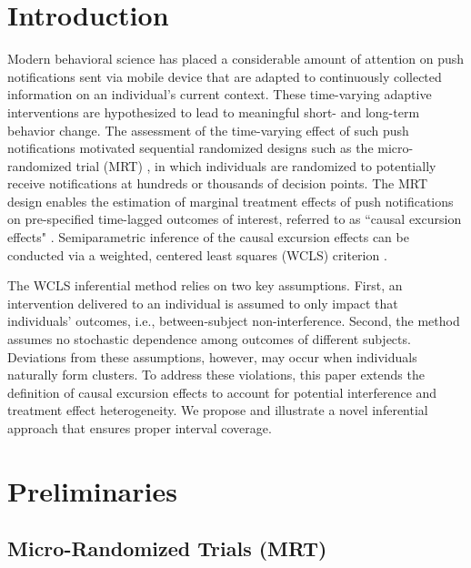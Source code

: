 \documentclass[lineno]{biometrika}
\begin{document}
\section{Introduction}

Modern behavioral science has placed a considerable amount of attention on push notifications sent via mobile device that are adapted to continuously collected information on an individual's current context.  These time-varying adaptive interventions are hypothesized to lead to meaningful short- and long-term behavior change. The assessment of the time-varying effect of such push notifications motivated sequential randomized designs such as the micro-randomized trial (MRT) \citep{Nahum2017, KlasnjaMRT}, in which individuals are randomized to potentially receive notifications at hundreds or thousands of decision points. The MRT design enables the estimation of marginal treatment effects of push notifications on pre-specified time-lagged outcomes of interest, referred to as ``causal excursion effects" \citep{Boruvkaetal, Qian2021, DempseyAOAS}. Semiparametric inference of the causal excursion effects can be conducted via a weighted, centered least squares (WCLS) criterion \citep{Boruvkaetal}. 

The WCLS inferential method relies on two key assumptions. First, an intervention delivered to an individual is assumed to only impact that individuals'  outcomes, i.e., between-subject non-interference. Second, the method assumes no stochastic dependence among outcomes of different subjects. Deviations from these assumptions, however, may occur when individuals naturally form clusters. To address these violations, this paper extends the definition of causal excursion effects to account for potential interference and treatment effect heterogeneity. We propose and illustrate a novel inferential approach that ensures proper interval coverage. 

\section{Preliminaries}
\label{section:preliminaries}

\subsection{Micro-Randomized Trials (MRT)}
\end{document}
